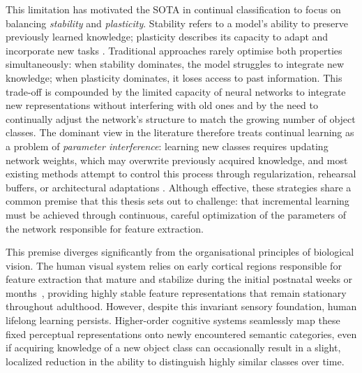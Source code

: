 This limitation has motivated the SOTA in continual classification to focus on balancing \emph{stability} and \emph{plasticity}. Stability refers to a model's ability to preserve previously learned knowledge; plasticity describes its capacity to adapt and incorporate new tasks \cite{API}. Traditional approaches rarely optimise both properties simultaneously: when stability dominates, the model struggles to integrate new knowledge; when plasticity dominates, it loses access to past information. This trade-off is compounded by the limited capacity of neural networks to integrate new representations without interfering with old ones and by the need to continually adjust the network's structure to match the growing number of object classes. The dominant view in the literature therefore treats continual learning as a problem of \emph{parameter interference}: learning new classes requires updating network weights, which may overwrite previously acquired knowledge, and most existing methods attempt to control this process through regularization, rehearsal buffers, or architectural adaptations \cite{CL}. Although effective, these strategies share a common premise that this thesis sets out to challenge: that incremental learning must be achieved through continuous, careful optimization of the parameters of the network responsible for feature extraction.

This premise diverges significantly from the organisational principles of biological vision. The human visual system relies on early cortical regions responsible for feature extraction that mature and stabilize during the initial postnatal weeks or months~\cite{Sluyters90}, providing highly stable feature representations that remain stationary throughout adulthood. However, despite this invariant sensory foundation, human lifelong learning persists. Higher-order cognitive systems seamlessly map these fixed perceptual representations onto newly encountered semantic categories, even if acquiring knowledge of a new object class can occasionally result in a slight, localized reduction in the ability to distinguish highly similar classes over time.

